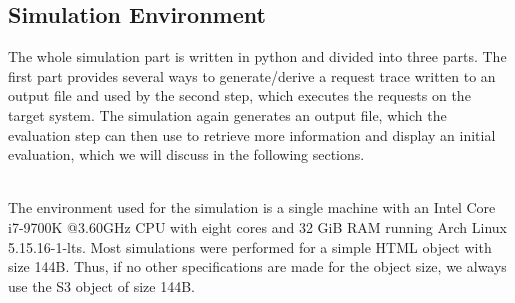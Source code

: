 \subsection{Simulation Environment}
\label{subsec:simulation_environment}
The whole simulation part is written in python and divided into three parts. The first part provides several ways to generate/derive a request trace written to an output file and used by the second step, which executes the requests on the target system. The simulation again generates an output file, which the evaluation step can then use to retrieve more information and display an initial evaluation, which we will discuss in the following sections.

~\\
The environment used for the simulation is a single machine with an Intel Core i7-9700K @3.60GHz CPU with eight cores and 32 GiB RAM running Arch Linux 5.15.16-1-lts. Most simulations were performed for a simple HTML object with size 144B. Thus, if no other specifications are made for the object size, we always use the S3 object of size 144B.

